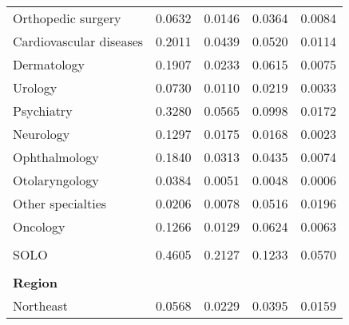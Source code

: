 {\begin{center}
\begin{longtable}{lllll}
Orthopedic surgery                     & 0.0632                   & 0.0146              & 0.0364                    & 0.0084               \\
Cardiovascular diseases                & 0.2011                   & 0.0439              & 0.0520                    & 0.0114               \\
Dermatology                            & 0.1907                   & 0.0233              & 0.0615                    & 0.0075               \\
Urology                                & 0.0730                   & 0.0110              & 0.0219                    & 0.0033               \\
Psychiatry                             & 0.3280                   & 0.0565              & 0.0998                    & 0.0172               \\
Neurology                              & 0.1297                   & 0.0175              & 0.0168                    & 0.0023               \\
Ophthalmology                          & 0.1840                   & 0.0313              & 0.0435                    & 0.0074               \\
Otolaryngology                         & 0.0384                   & 0.0051              & 0.0048                    & 0.0006               \\
Other specialties                      & 0.0206                   & 0.0078              & 0.0516                    & 0.0196               \\
Oncology                               & 0.1266                   & 0.0129              & 0.0624                    & 0.0063               \\
                                       &                          &                     &                           &                      \\
SOLO                                   & 0.4605                   & 0.2127              & 0.1233                    & 0.0570               \\
                                       &                          &                     &                           &                      \\
\textbf{Region}                        &                          &                     &                           &                      \\
Northeast                              & 0.0568                   & 0.0229              & 0.0395                    & 0.0159               \\

\end{longtable}
\end{center}}
